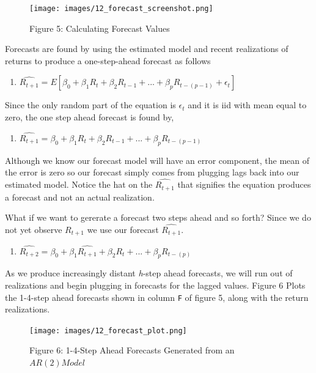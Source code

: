 \documentclass[
]{book}
\providecommand{\tightlist}{%
  \setlength{\itemsep}{0pt}\setlength{\parskip}{0pt}}
\begin{document}
\begin{figure}
\centering
\texttt{[image: images/12\_forecast\_screenshot.png]}
\caption{Figure 5: Calculating Forecast Values}
\end{figure}

Forecasts are found by using the estimated model and recent realizations of returns to produce a one-step-ahead forecast as follows

\begin{enumerate}
\def\labelenumi{\arabic{enumi}.}
\setcounter{enumi}{2}
\tightlist
\item
  \(\hat{R_{t+1}} = E[\beta_0 + \beta_1R_{t} + \beta_2R_{t-1}+ ... + \beta_{p}R_{t-(p-1)} + \epsilon_t]\)
\end{enumerate}

Since the only random part of the equation is \(\epsilon_t\) and it is iid with mean equal to zero, the one step ahead forecast is found by,

\begin{enumerate}
\def\labelenumi{\arabic{enumi}.}
\setcounter{enumi}{3}
\tightlist
\item
  \(\hat{R_{t+1}} = \beta_0 + \beta_1R_{t} + \beta_2R_{t-1}+ ... + \beta_{p}R_{t-(p-1)}\)
\end{enumerate}

Although we know our forecast model will have an error component, the mean of the error is zero so our forecast simply comes from plugging lags back into our estimated model. Notice the hat on the \(\hat{R_{t+1}}\) that signifies the equation produces a forecast and not an actual realization.

What if we want to gererate a forecast two steps ahead and so forth? Since we do not yet observe \(R_{t+1}\) we use our forecast \(\hat{R_{t+1}}\).

\begin{enumerate}
\def\labelenumi{\arabic{enumi}.}
\setcounter{enumi}{4}
\tightlist
\item
  \(\hat{R_{t+2}} = \beta_0 + \beta_1\hat{R_{t+1}} + \beta_2R_{t}+ ... + \beta_{p}R_{t-(p)}\)
\end{enumerate}

As we produce increasingly distant \emph{h}-step ahead forecasts, we will run out of realizations and begin plugging in forecasts for the lagged values. Figure 6 Plots the 1-4-step ahead forecasts shown in column \texttt{F} of figure 5, along with the return realizations.

\begin{figure}
\centering
\texttt{[image: images/12\_forecast\_plot.png]}
\caption{Figure 6: 1-4-Step Ahead Forecasts Generated from an \(AR(2) Model\)}
\end{figure}
\end{document}
